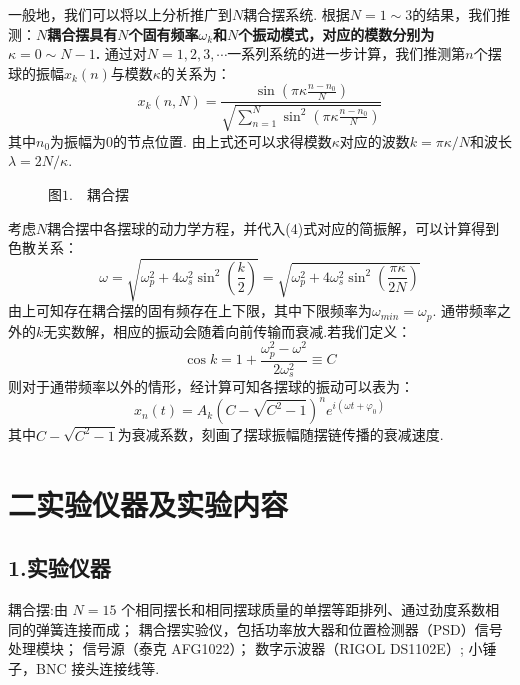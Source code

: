 \documentclass{ctexart}
\begin{document}
一般地，我们可以将以上分析推广到$N$耦合摆系统. 根据$N=1\sim 3$的结果，我们推测：\textbf{$N$耦合摆具有$N$个固有频率$\omega_k$和$N$个振动模式，对应的模数分别为$\kappa=0\sim N-1$. }
\noindent 通过对$N=1,2,3,\cdots$一系列系统的进一步计算，我们推测第$n$个摆球的振幅$x_k(n)$与模数$\kappa$的关系为：
\begin{equation}
  x_k(n,N)=\displaystyle\frac{\sin(\pi\kappa\frac{n-n_0}{N})}{\sqrt{\sum_{n=1}^N\sin^2(\pi\kappa\frac{n-n_0}{N})} }\tag{3}
\end{equation}
其中$n_0$为振幅为$0$的节点位置. 由上式还可以求得模数$\kappa$对应的波数$k=\pi\kappa/N$和波长$\lambda=2N/\kappa$.
\begin{figure}[htbp]
  \centering
   \qquad
   \qquad
   \caption*{图$1.\quad$耦合摆}
  \end{figure}
\clearpage
考虑$N$耦合摆中各摆球的动力学方程，并代入(4)式对应的简振解，可以计算得到色散关系：
\begin{equation}
  \omega=\sqrt{\omega_p^2+4\omega_s^2\sin^2\left(\frac{k}{2}\right)}=\sqrt{\omega_p^2+4\omega_s^2\sin^2\left(\frac{\pi\kappa}{2N}\right)}\tag{4}
\end{equation}
由上可知存在耦合摆的固有频存在上下限，其中下限频率为$\omega_{min}=\omega_p$. 通带频率之外的$k$无实数解，相应的振动会随着向前传输而衰减.若我们定义：
\begin{equation}
  \cos k=1+\frac{\omega_p^2-\omega^2}{2\omega_s^2}\equiv C\tag{5}
\end{equation}
则对于通带频率以外的情形，经计算可知各摆球的振动可以表为：
\begin{equation}
  x_n(t)=A_k (C-\sqrt{C^2-1})^n e^{i(\omega t+\varphi_0)}\tag{6}
\end{equation}
其中$C-\sqrt{C^2-1}$为衰减系数，刻画了摆球振幅随摆链传播的衰减速度.
\section*{二\quad  实验仪器及实验内容}
\subsection*{1.\quad 实验仪器}
  耦合摆:由 $N=15$ 个相同摆长和相同摆球质量的单摆等距排列、通过劲度系数相同的弹簧连接而成；
  耦合摆实验仪，包括功率放大器和位置检测器（PSD）信号处理模块；  信号源（泰克 AFG1022）； 数字示波器（RIGOL DS1102E）;  小锤子，BNC 接头连接线等.
\end{document}
